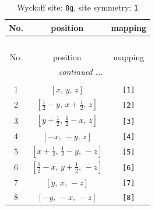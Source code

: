 \documentclass[fleqn,8pt]{jsarticle}
\begin{document}
\renewcommand{\arraystretch}{1.2}
\begin{longtable}{ccc}
\caption{Wyckoff site: {\tt 8g}, site symmetry: {\tt 1}}
 \\
 \hline \hline
No. & position & mapping \\ \hline \endfirsthead

\multicolumn{2}{l}{\tablename\ \thetable{}} \\
 \hline \hline
No. & position & mapping \\ \hline \endhead

 \hline \hline
\multicolumn{2}{r}{\footnotesize\it continued ...} \\ \endfoot

 \hline \hline
\multicolumn{2}{r}{} \\ \endlastfoot

1 & $\left[ x,\, y,\, z \right]$ & {\tt [1]} \\ \hline
2 & $\left[ \frac{1}{2} - y,\, x + \frac{1}{2},\, z \right]$ & {\tt [2]} \\ \hline
3 & $\left[ y + \frac{1}{2},\, \frac{1}{2} - x,\, z \right]$ & {\tt [3]} \\ \hline
4 & $\left[ - x,\, - y,\, z \right]$ & {\tt [4]} \\ \hline
5 & $\left[ x + \frac{1}{2},\, \frac{1}{2} - y,\, - z \right]$ & {\tt [5]} \\ \hline
6 & $\left[ \frac{1}{2} - x,\, y + \frac{1}{2},\, - z \right]$ & {\tt [6]} \\ \hline
7 & $\left[ y,\, x,\, - z \right]$ & {\tt [7]} \\ \hline
8 & $\left[ - y,\, - x,\, - z \right]$ & {\tt [8]} \\
\end{longtable}
\end{document}
